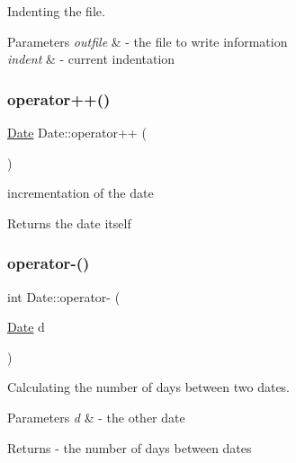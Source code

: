 Indenting the file. 


\begin{DoxyParams}{Parameters}
{\em outfile} & -\/ the file to write information \\
\hline
{\em indent} & -\/ current indentation \\
\hline
\end{DoxyParams}
\mbox{\label{class_date_a0c5386da90c6834a3e7a110b02e2abaa}} 
\subsubsection{\texorpdfstring{operator++()}{operator++()}}
{\footnotesize\ttfamily \mbox{\hyperlink{class_date}{Date}} Date\+::operator++ (\begin{DoxyParamCaption}{ }\end{DoxyParamCaption})}



incrementation of the date 

\begin{DoxyReturn}{Returns}
the date itself 
\end{DoxyReturn}
\mbox{\label{class_date_a5f459b53c99391cc464c0c55268d133c}} 
\subsubsection{\texorpdfstring{operator-\/()}{operator-()}}
{\footnotesize\ttfamily int Date\+::operator-\/ (\begin{DoxyParamCaption}\item[{\mbox{\hyperlink{class_date}{Date}}}]{d }\end{DoxyParamCaption})}



Calculating the number of days between two dates. 


\begin{DoxyParams}{Parameters}
{\em d} & -\/ the other date \\
\hline
\end{DoxyParams}
\begin{DoxyReturn}{Returns}
-\/ the number of days between dates 
\end{DoxyReturn}
\mbox{\label{class_date_a0036e87463cdee6117d27f04933393fb}} 
